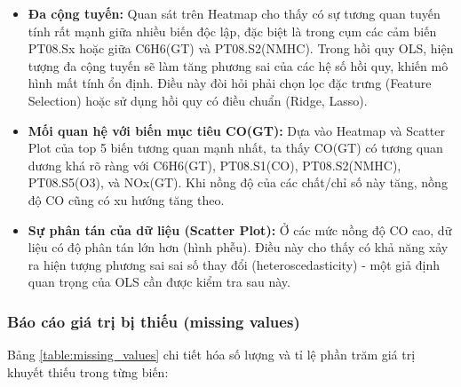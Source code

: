 \documentclass[12pt,a4paper]{report}
\begin{document}
\begin{itemize}
    \item \textbf{Đa cộng tuyến: } Quan sát trên Heatmap cho thấy có sự tương quan tuyến tính rất mạnh giữa nhiều biến độc lập, đặc biệt là trong cụm các cảm biến PT08.Sx hoặc giữa C6H6(GT) và PT08.S2(NMHC). Trong hồi quy OLS, hiện tượng đa cộng tuyến sẽ làm tăng phương sai của các hệ số hồi quy, khiến mô hình mất tính ổn định. Điều này đòi hỏi phải chọn lọc đặc trưng (Feature Selection) hoặc sử dụng hồi quy có điều chuẩn (Ridge, Lasso).
    
    \item \textbf{Mối quan hệ với biến mục tiêu CO(GT):} Dựa vào Heatmap và Scatter Plot của top 5 biến tương quan mạnh nhất, ta thấy CO(GT) có tương quan dương khá rõ ràng với C6H6(GT), PT08.S1(CO), PT08.S2(NMHC), PT08.S5(O3), và NOx(GT). Khi nồng độ của các chất/chỉ số này tăng, nồng độ CO cũng có xu hướng tăng theo.
    
    \item \textbf{Sự phân tán của dữ liệu (Scatter Plot): } Ở các mức nồng độ CO cao, dữ liệu có độ phân tán lớn hơn (hình phễu). Điều này cho thấy có khả năng xảy ra hiện tượng phương sai sai số thay đổi (heteroscedasticity) - một giả định quan trọng của OLS cần được kiểm tra sau này.
\end{itemize}

\subsubsection{Báo cáo giá trị bị thiếu (missing values)}
 
Bảng \ref{table:missing_values} chi tiết hóa số lượng và tỉ lệ phần trăm giá trị khuyết thiếu trong từng biến:
 
\end{document}
